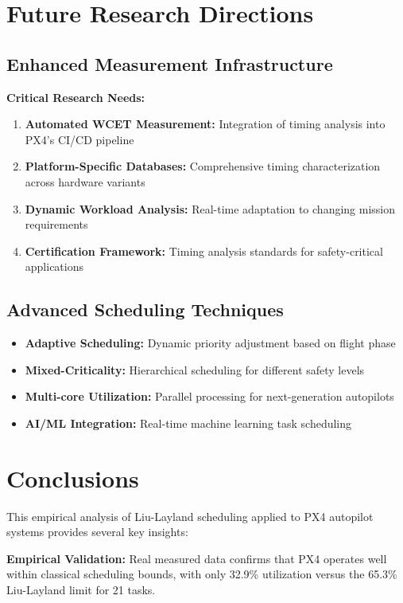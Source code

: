 \documentclass[12pt,a4paper]{article}
\begin{document}
\section{Future Research Directions}

\subsection{Enhanced Measurement Infrastructure}

\textbf{Critical Research Needs:}

\begin{enumerate}
\item \textbf{Automated WCET Measurement:} Integration of timing analysis into PX4's CI/CD pipeline
\item \textbf{Platform-Specific Databases:} Comprehensive timing characterization across hardware variants
\item \textbf{Dynamic Workload Analysis:} Real-time adaptation to changing mission requirements
\item \textbf{Certification Framework:} Timing analysis standards for safety-critical applications
\end{enumerate}

\subsection{Advanced Scheduling Techniques}

\begin{itemize}
\item \textbf{Adaptive Scheduling:} Dynamic priority adjustment based on flight phase
\item \textbf{Mixed-Criticality:} Hierarchical scheduling for different safety levels
\item \textbf{Multi-core Utilization:} Parallel processing for next-generation autopilots
\item \textbf{AI/ML Integration:} Real-time machine learning task scheduling
\end{itemize}

\section{Conclusions}

This empirical analysis of Liu-Layland scheduling applied to PX4 autopilot systems provides several key insights:

\textbf{Empirical Validation:} Real measured data confirms that PX4 operates well within classical scheduling bounds, with only 32.9\% utilization versus the 65.3\% Liu-Layland limit for 21 tasks.
\end{document}
